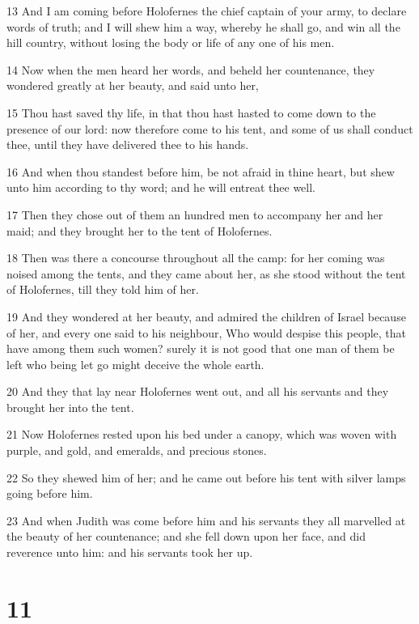 \par 13 And I am coming before Holofernes the chief captain of your army, to declare words of truth; and I will shew him a way, whereby he shall go, and win all the hill country, without losing the body or life of any one of his men.
\par 14 Now when the men heard her words, and beheld her countenance, they wondered greatly at her beauty, and said unto her,
\par 15 Thou hast saved thy life, in that thou hast hasted to come down to the presence of our lord: now therefore come to his tent, and some of us shall conduct thee, until they have delivered thee to his hands.
\par 16 And when thou standest before him, be not afraid in thine heart, but shew unto him according to thy word; and he will entreat thee well.
\par 17 Then they chose out of them an hundred men to accompany her and her maid; and they brought her to the tent of Holofernes.
\par 18 Then was there a concourse throughout all the camp: for her coming was noised among the tents, and they came about her, as she stood without the tent of Holofernes, till they told him of her.
\par 19 And they wondered at her beauty, and admired the children of Israel because of her, and every one said to his neighbour, Who would despise this people, that have among them such women? surely it is not good that one man of them be left who being let go might deceive the whole earth.
\par 20 And they that lay near Holofernes went out, and all his servants and they brought her into the tent.
\par 21 Now Holofernes rested upon his bed under a canopy, which was woven with purple, and gold, and emeralds, and precious stones.
\par 22 So they shewed him of her; and he came out before his tent with silver lamps going before him.
\par 23 And when Judith was come before him and his servants they all marvelled at the beauty of her countenance; and she fell down upon her face, and did reverence unto him: and his servants took her up.

\chapter{11}

